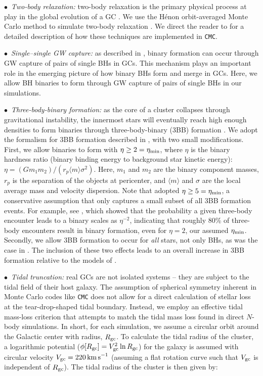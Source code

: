 \documentclass[twocolumn,tighten]{aastex63}
\begin{document}
    $\bullet\,$ \textit{Two-body relaxation:} two-body relaxation is the primary physical process at play in the global evolution of a GC \citep[e.g.,][]{HeggieHut2003}. We use the H\'{e}non orbit-averaged Monte Carlo method to simulate two-body relaxation \citep{Henon1971a,Henon1971b}. We direct the reader to \citet{Joshi2000} for a detailed description of how these techniques are implemented in \texttt{CMC}.
    
    $\bullet\,$ \textit{Single--single GW capture:} as described in \citet{Samsing2019_singlesingle}, binary formation can occur through GW capture of pairs of single BHs in GCs. This mechanism plays an important role in the emerging picture of how binary BHs form and merge in GCs. Here, we allow BH binaries to form through GW capture of pairs of single BHs in our simulations.
    
    $\bullet\,$ \textit{Three-body-binary formation:} as the core of a cluster collapses through gravitational instability, the innermost stars will eventually reach high enough densities to form binaries through three-body-binary (3BB) formation \citep[e.g.,][]{HeggieHut2003}. We adopt the formalism for 3BB formation described in \citet{Morscher2015}, with two small modifications. First, we allow binaries to form with $\eta \geq 2 = \eta_{\rm{min}}$, where $\eta$ is the binary hardness ratio (binary binding energy to background star kinetic energy): $\eta = (Gm_1m_2)/(r_p \langle m \rangle \sigma^2).$ Here, $m_1$ and $m_2$ are the binary component masses, $r_p$ is the separation of the objects at pericenter, and $\langle m \rangle$ and $\sigma$ are the local average mass and velocity dispersion. Note that \citet{Morscher2015} adopted $\eta \geq 5 = \eta_{\rm{min}}$, a conservative assumption that only captures a small subset of all 3BB formation events. For example, see \citet{Aarseth1976}, which showed that the probability a given three-body encounter leads to a binary scales as $\eta^{-2}$, indicating that roughly 80\% of three-body encounters result in binary formation, even for $\eta=2$, our assumed $\eta_{\rm{min}}$. Secondly, we allow 3BB formation to occur for \textit{all} stars, not only BHs, as was the case in \citet{Morscher2015}. The inclusion of these two effects leads to an overall increase in 3BB formation relative to the models of \citet{Morscher2015}.
    
    $\bullet\,$ \textit{Tidal truncation:} real GCs are not isolated systems -- they are subject to the tidal field of their host galaxy. The assumption of spherical symmetry inherent in Monte Carlo codes like \texttt{CMC} does not allow for a direct calculation of stellar loss at the tear-drop-shaped tidal boundary. Instead, we employ an effective tidal mass-loss criterion that attempts to match the tidal mass loss found in direct $N$-body simulations. In short, for each simulation, we assume a circular orbit around the Galactic center with radius, $R_{\rm{gc}}$. To calculate the tidal radius of the cluster, a logarithmic potential ($\phi [R_{\rm{gc}}] = V_{\rm{gc}}^2 \ln R_{\rm{gc}}$) for the galaxy is assumed with circular velocity $V_{\rm{gc}}=220\,\rm{km\,s}^{-1}$ (assuming a flat rotation curve such that $V_{\rm{gc}}$ is independent of $R_{\rm{gc}}$). The tidal radius of the cluster is then given by:
    
\end{document}
